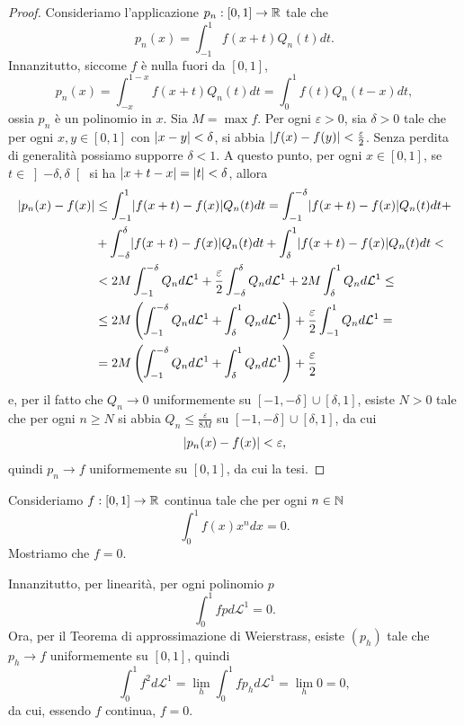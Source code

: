 \begin{proof}
	Consideriamo l'applicazione $p_n: [0,1]\to \mathbb{R}$ tale che
	\[ p_n(x) = \int_{-1}^1 f(x+t)Q_n(t)dt. \]
	Innanzitutto, siccome $f$ è nulla fuori da $[0,1]$,
	\[ p_n(x) = \int_{-x}^{1-x}f(x+t)Q_n(t) dt = \int_0^1 f(t) Q_n(t-x) dt, \]
	ossia $p_n$ è un polinomio in $x$. Sia $M = \max f$. Per ogni $\varepsilon>0$, sia $\delta >0$ tale che per ogni $x,y \in [0,1]$ con $\lvert x-y\rvert <\delta$, si abbia $\lvert f(x)-f(y)\rvert<\frac{\varepsilon}{2}$. Senza perdita di generalità possiamo supporre $\delta <1$. A questo punto, per ogni $x \in [0,1]$, se $t \in \left] -\delta,\delta\right[ $ si ha $\lvert x+t-x\rvert = \lvert t\rvert<\delta$, allora
	\begin{align*}
		\lvert p_n(x)-f(x)\rvert&\le \int_{-1}^1 \lvert f(x+t)-f(x)\rvert Q_n(t) dt = \int_{-1}^{-\delta}\lvert f(x+t)-f(x)\rvert Q_n(t) dt + \\
		&+ \int_{-\delta}^{\delta}\lvert f(x+t)-f(x)\rvert Q_n(t) dt+ \int_{\delta}^{1}\lvert f(x+t)-f(x)\rvert Q_n(t) dt <\\
		&<2M \int_{-1}^{-\delta} Q_n d\mathcal{L}^1 + \frac{\varepsilon}{2}\int_{-\delta}^{\delta}Q_nd\mathcal{L}^1 +2M \int_{\delta}^{1} Q_n d\mathcal{L}^1 \le \\
		&\le 2M\left( \int_{-1}^{-\delta} Q_n d\mathcal{L}^1 + \int_{\delta}^{1} Q_n d\mathcal{L}^1\right)  + \frac{\varepsilon}{2}\int_{-1}^{1}Q_nd\mathcal{L}^1 = \\
		&=2M\left( \int_{-1}^{-\delta} Q_n d\mathcal{L}^1 + \int_{\delta}^{1} Q_n d\mathcal{L}^1\right)  + \frac{\varepsilon}{2}
	\end{align*}
	e, per il fatto che $Q_n \to 0$ uniformemente su $[-1,-\delta]\cup [\delta,1]$, esiste $N >0$ tale che per ogni $n \ge N$ si abbia $Q_n\le \frac{\varepsilon}{8M}$ su $[-1,-\delta]\cup [\delta,1]$, da cui 
	\[ 	\lvert p_n(x)-f(x)\rvert< \varepsilon, \]
	quindi $p_n \to f$ uniformemente su $[0,1]$, da cui la tesi.
\end{proof}

\begin{esempio}
Consideriamo $f: [0,1]\to \mathbb{R}$ continua tale che per ogni $n \in \mathbb{N}$
\[ \int_{0}^{1}f(x)x^n dx = 0. \]
Mostriamo che $f = 0$.

Innanzitutto, per linearità, per ogni polinomio $p$
\[ \int_{0}^{1}f p d\mathcal{L}^1 = 0. \]
Ora, per il Teorema di approssimazione di Weierstrass, esiste $(p_h)$ tale che $p_h \to f$ uniformemente su $[0,1]$, quindi 
\[ \int_{0}^{1} f^2 d\mathcal{L}^1 = \lim\limits_{h} \int_{0}^{1} fp_h d\mathcal{L}^1 = \lim\limits_{h} 0 = 0, \]
da cui, essendo $f$ continua, $f=0$.
\end{esempio}


